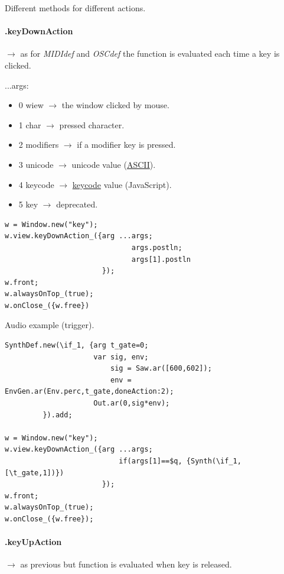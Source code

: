 Different methods for different actions.

\paragraph{.keyDownAction} \(\rightarrow\) as for \textit{MIDIdef} and \textit{OSCdef} the function is evaluated each time a key is clicked.

...args:

\begin{itemize}
\tightlist
\item 0 wiew \(\rightarrow\) the window clicked by mouse.
\item 1 char \(\rightarrow\) pressed character.
\item 2 modifiers \(\rightarrow\)  if a modifier key is pressed.
\item 3 unicode \(\rightarrow\) unicode value (\href{https://ss64.com/ascii.html}{ASCII}).
\item 4 keycode \(\rightarrow\) \href{https://www.toptal.com/developers/keycode}{keycode} value (JavaScript).
\item 5 key \(\rightarrow\) deprecated.
\end{itemize}

\begin{lstlisting}[frame=single, caption=keyDownAction model] 
w = Window.new("key");
w.view.keyDownAction_({arg ...args;
                              args.postln;
                              args[1].postln
                       });
w.front;
w.alwaysOnTop_(true);
w.onClose_({w.free})
\end{lstlisting} 

Audio example (trigger).

\begin{lstlisting}[frame=single] 
SynthDef.new(\if_1, {arg t_gate=0;
                     var sig, env;
                         sig = Saw.ar([600,602]);
                         env = EnvGen.ar(Env.perc,t_gate,doneAction:2);
                     Out.ar(0,sig*env);
         }).add;

w = Window.new("key");
w.view.keyDownAction_({arg ...args;
                           if(args[1]==$q, {Synth(\if_1, [\t_gate,1])}) 
                       });
w.front;
w.alwaysOnTop_(true);
w.onClose_({w.free});
\end{lstlisting} 

\paragraph{.keyUpAction} \(\rightarrow\) as previous but function is evaluated when key is released.


